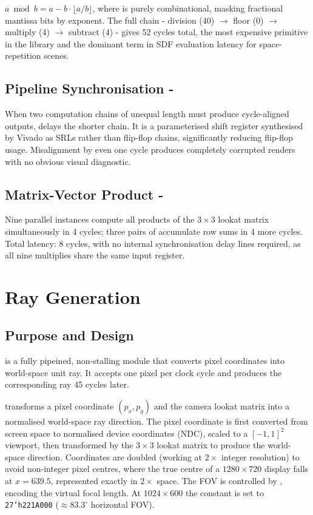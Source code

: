 $a \bmod b = a - b\cdot\lfloor a/b\rfloor$, where  is purely
combinational, masking fractional mantissa bits by exponent. The full chain -
division (40) $\to$ floor (0) $\to$ multiply (4) $\to$ subtract (4) - gives
52 cycles total, the most expensive primitive in the library and the dominant
term in SDF evaluation latency for space-repetition scenes.

\subsection{Pipeline Synchronisation - }

When two computation chains of unequal length must produce cycle-aligned
outputs,  delays the shorter chain. It is a parameterised
shift register synthesised by Vivado as SRLs rather than flip-flop chains,
significantly reducing flip-flop usage. Misalignment by even one cycle produces
completely corrupted renders with no obvious visual diagnostic.

\subsection{Matrix-Vector Product - }

Nine parallel  instances compute all products of the $3\times3$
lookat matrix simultaneously in 4 cycles; three pairs of 
accumulate row sums in 4 more cycles. Total latency: 8 cycles, with no internal
synchronisation delay lines required, as all nine multiplies share the same
input register.

\FloatBarrier


\section{Ray Generation}

\subsection{Purpose and Design}
 is a fully pipeined, non-stalling module that converts pixel coordinates into world-space unit ray. It accepts one pixel per clock cycle  and produces the corresponding ray 45 cycles later.

 transforms a pixel coordinate $(p_x, p_y)$ and the camera
lookat matrix into a normalised world-space ray direction. The pixel coordinate
is first converted from screen space to normalised device coordinates (NDC),
scaled to a $[-1, 1]^2$ viewport, then transformed by the $3 \times 3$ lookat
matrix to produce the world-space direction. Coordinates are doubled
(working at $2\times$ integer resolution) to avoid non-integer pixel centres,
where the true centre of a $1280 \times 720$ display falls at $x = 639.5$,
represented exactly in $2\times$ space. The FOV is controlled by
, encoding the virtual focal length. At $1024\times600$ the
constant is set to \texttt{27'h221A000} ($\approx 83.3^\circ$ horizontal FOV). 

